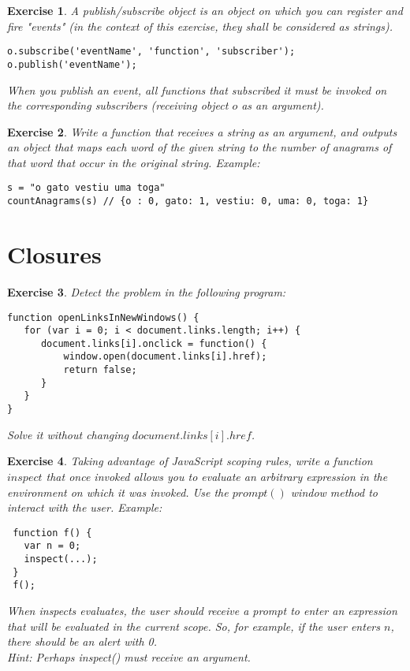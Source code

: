 \documentclass{article}
\newtheorem{ex}{Exercise}[section]
\begin{document}
\begin{ex}
A publish/subscribe object is an object on which you can register and fire "events" 
(in the context of this exercise, they shall be considered as strings).
\begin{verbatim}
o.subscribe('eventName', 'function', 'subscriber'); 
o.publish('eventName');  
\end{verbatim}   
When you publish an event, all functions that subscribed it must be invoked on the 
corresponding subscribers (receiving object $o$ as an argument).  
\end{ex}


\begin{ex}
Write a function that receives a string as an argument, and outputs an object 
that maps each word of the given string to the number of anagrams of that word that 
occur in the original string. 
Example: 
\begin{verbatim}
s = "o gato vestiu uma toga"
countAnagrams(s) // {o : 0, gato: 1, vestiu: 0, uma: 0, toga: 1}
\end{verbatim}
\end{ex}


\section{Closures} 

\begin{ex} 
Detect the problem in the following program: 
\begin{verbatim}
function openLinksInNewWindows() {
   for (var i = 0; i < document.links.length; i++) {
      document.links[i].onclick = function() {
          window.open(document.links[i].href); 
          return false;
      }
   }
} 
\end{verbatim} 
Solve it without changing $document.links[i].href$.  
\end{ex} 


\begin{ex} 
Taking advantage of JavaScript scoping rules, write a function $inspect$ that once
invoked allows you to evaluate an arbitrary expression in the environment on which
it was invoked. Use the $prompt()$ window method to interact with the user. 
Example: 
\begin{verbatim}
 function f() {
   var n = 0; 
   inspect(...); 
 } 
 f(); 
\end{verbatim}
When inspects evaluates, the user should receive a prompt to enter an expression 
that will be evaluated in the current scope. So, for example, if the user enters $n$, there
should be an alert with 0.\\ 
\noindent\textit{Hint:} Perhaps inspect() must receive an argument. 
\end{ex} 
\end{document}
